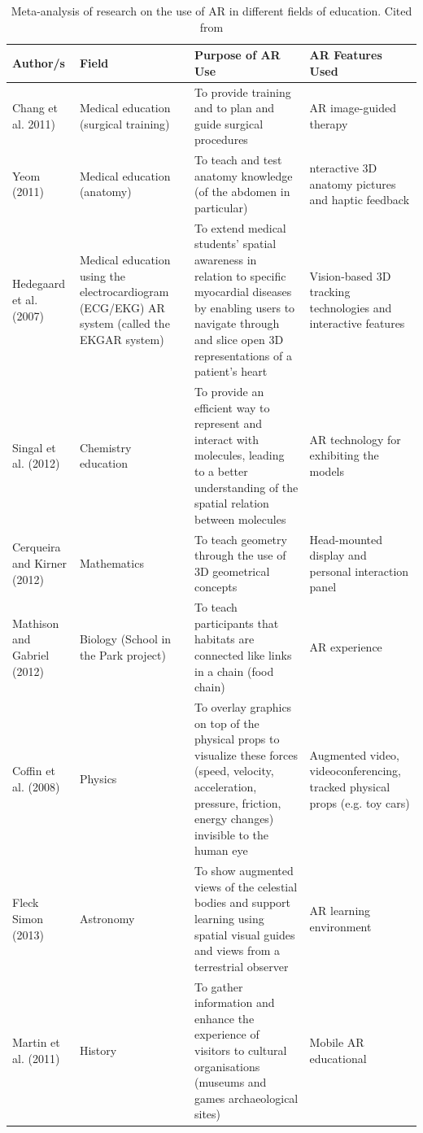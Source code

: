 \documentclass[12 pct]{report}
\begin{document}
\begin{table}[H]
\centering
 \begin{tabular}{||p{20mm} p{30mm} p{40mm} p{30mm}||} 
 \hline
 Author/s & Field & Purpose of AR Use & AR Features Used \\ [0.5ex] 
 \hline\hline
 Chang et al. 2011) & Medical education (surgical training) & To provide training and to plan and guide surgical procedures & AR image-guided therapy \\ 
 Yeom (2011) & Medical education (anatomy) & To teach and test anatomy knowledge (of the abdomen in particular)  & nteractive 3D anatomy pictures and haptic feedback \\
 Hedegaard et al.(2007) & Medical education using the electrocardiogram (ECG/EKG) AR system (called the EKGAR system) & To extend medical students’ spatial awareness in relation to specific myocardial diseases by enabling users to navigate through and slice open 3D representations of a patient’s heart & Vision-based 3D tracking technologies and interactive features \\
 Singal et al. (2012) & Chemistry education & To provide an efficient way to represent and interact with molecules, leading to a better understanding of the spatial relation between molecules & AR technology for exhibiting the models \\
 Cerqueira and Kirner (2012) & Mathematics & To teach geometry through the use of 3D geometrical concepts & Head-mounted display and personal interaction panel  \\ 
 Mathison and Gabriel (2012) & Biology (School in the Park project) & To teach participants that habitats are connected like links in a chain (food chain) & AR experience  \\
 Coffin et al. (2008) &  Physics & To overlay graphics on top of the physical props to visualize these forces (speed, velocity, acceleration, pressure, friction, energy changes) invisible to the human eye  & Augmented video, videoconferencing, tracked physical props (e.g. toy cars) \\
 Fleck Simon (2013) & Astronomy  & To show augmented views of the celestial bodies and support learning using spatial visual guides and views from a terrestrial observer & AR learning environment \\
 Martin et al. (2011) & History & To gather information and enhance the experience of visitors to cultural organisations (museums and games archaeological sites) & Mobile AR educational \\
 \hline
 \end{tabular}
  \caption{Meta-analysis of research on the use of AR in different fields of education. Cited from \cite{saidinar}  \label{tab:a} }
\end{table}
\end{document}
